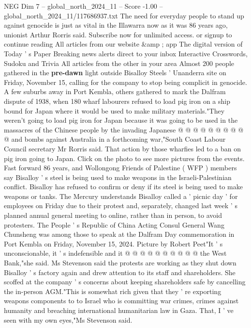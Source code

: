 \begin{textsample}{NEG Dim 7 – global\_north\_2024\_11 – Score -1.00 – global\_north\_2024\_11/117686937.txt}  \label{ex:f7_neg_339}
The need for everyday people to stand up against genocide is just as vital in the Illawarra now as it was 86 years ago, unionist Arthur Rorris said.
Subscribe now for unlimited access. or signup to continue reading All articles from our website \&amp ; app The digital version of Today ' s Paper Breaking news alerts direct to your inbox Interactive Crosswords, Sudoku and Trivia All articles from the other in your area Almost 200 people gathered in the \textbf{pre-dawn} light outside Bisalloy Steels ' Unanderra site on Friday, November 15, calling for the company to stop being complicit in genocide.
A few suburbs away in Port Kembla, others gathered to mark the Dalfram dispute of 1938, when 180 wharf labourers refused to load pig iron on a ship bound for Japan where it would be used to make military materials."They weren't going to load pig iron for Japan because it was going to be used in the massacres of the Chinese people by the invading Japanese @ @ @ @ @ @ @ @ @ @ and bombs against Australia in a forthcoming war,"South Coast Labour Council secretary Mr Rorris said.
That action by those wharfies led to a ban on pig iron going to Japan.
Click on the photo to see more pictures from the events.
Fast forward 86 years, and Wollongong Friends of Palestine ( WFP ) members say Bisalloy ' s steel is being used to make weapons in the Israeli-Palestinian conflict.
Bisalloy has refused to confirm or deny if its steel is being used to make weapons or tanks.
The Mercury understands Bisalloy called a ' picnic day ' for employees on Friday due to their protest and, separately, changed last week ' s planned annual general meeting to online, rather than in person, to avoid protesters.
The People ' s Republic of China Acting Consul General Wang Chunsheng was among those to speak at the Dalfram Day commemoration in Port Kembla on Friday, November 15, 2024.
Picture by Robert Peet"It ' s unconscionable, it ' s indefensible and it @ @ @ @ @ @ @ @ @ @ the West Bank,"she said.
Ms Stevenson said the protests are working as they shut down Bisalloy ' s factory again and drew attention to its staff and shareholders.
She scoffed at the company ' s concerns about keeping shareholders safe by cancelling the in-person AGM."This is somewhat rich given that they ' re exporting weapons components to to Israel who is committing war crimes, crimes against humanity and breaching international humanitarian law in Gaza.
That, I ' ve seen with my own eyes,"Ms Stevenson said.

\end{textsample}
